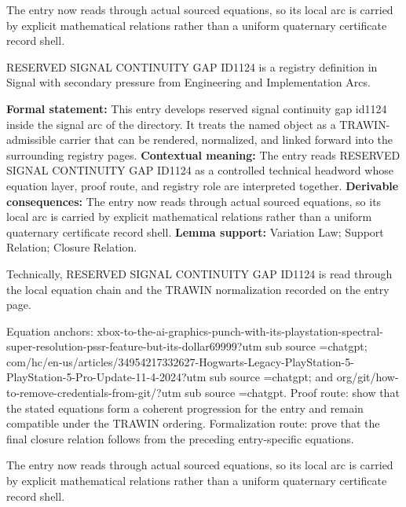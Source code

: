 The entry now reads through actual sourced equations, so its local arc is carried by explicit mathematical relations rather than a uniform quaternary certificate record shell.
\clearpage


\begingroup\small
{}
RESERVED SIGNAL CONTINUITY GAP ID1124 is a registry definition in Signal with secondary pressure from Engineering and Implementation Arcs.

\begingroup\footnotesize\setlength{\emergencystretch}{3em}\sloppy
\textbf{Formal statement:} This entry develops reserved signal continuity gap id1124 inside the signal arc of the directory. It treats the named object as a TRAWIN-admissible carrier that can be rendered, normalized, and linked forward into the surrounding registry pages. \textbf{Contextual meaning:} The entry reads RESERVED SIGNAL CONTINUITY GAP ID1124 as a controlled technical headword whose equation layer, proof route, and registry role are interpreted together. \textbf{Derivable consequences:} The entry now reads through actual sourced equations, so its local arc is carried by explicit mathematical relations rather than a uniform quaternary certificate record shell. \textbf{Lemma support:} Variation Law; Support Relation; Closure Relation.\par
\endgroup

Technically, RESERVED SIGNAL CONTINUITY GAP ID1124 is read through the local equation chain and the TRAWIN normalization recorded on the entry page.

Equation anchors: xbox-to-the-ai-graphics-punch-with-its-playstation-spectral-super-resolution-pssr-feature-but-its-dollar69999?utm sub source =chatgpt; com/hc/en-us/articles/34954217332627-Hogwarts-Legacy-PlayStation-5-PlayStation-5-Pro-Update-11-4-2024?utm sub source =chatgpt; and org/git/how-to-remove-credentials-from-git/?utm sub source =chatgpt. Proof route: show that the stated equations form a coherent progression for the entry and remain compatible under the TRAWIN ordering. Formalization route: prove that the final closure relation follows from the preceding entry-specific equations.

The entry now reads through actual sourced equations, so its local arc is carried by explicit mathematical relations rather than a uniform quaternary certificate record shell.
\endgroup

